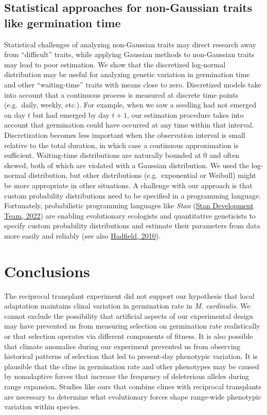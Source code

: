 \documentclass[
  12pt,
]{article}
\begin{document}
\hypertarget{statistical-approaches-for-non-gaussian-traits-like-germination-time}{%
\subsection{Statistical approaches for non-Gaussian traits like germination time}\label{statistical-approaches-for-non-gaussian-traits-like-germination-time}}

Statistical challenges of analyzing non-Gaussian traits may direct research away from ``difficult'' traits, while applying Gaussian methods to non-Gaussian traits may lead to poor estimation. We show that the discretized log-normal distribution may be useful for analyzing genetic variation in germination time and other ``waiting-time'' traits with means close to zero. Discretized models take into account that a continuous process is measured at discrete time points (e.g.~daily, weekly, etc.). For example, when we saw a seedling had not emerged on day \(t\) but had emerged by day \(t+1\), our estimation procedure takes into account that germination could have occurred at any time within that interval. Discretization becomes less important when the observation interval is small relative to the total duration, in which case a continuous approximation is sufficient. Waiting-time distributions are naturally bounded at \(0\) and often skewed, both of which are violated with a Gaussian distribution. We used the log-normal distribution, but other distributions (e.g.~exponential or Weibull) might be more appropriate in other situations. A challenge with our approach is that custom probability distributions need to be specified in a programming language. Fortunately, probabilistic programming languages like \emph{Stan} (\protect\hyperlink{ref-stan_development_team_stan_2022}{Stan Development Team, 2022}) are enabling evolutionary ecologists and quantitative geneticists to specify custom probability distributions and estimate their parameters from data more easily and reliably (see also \protect\hyperlink{ref-hadfield_mcmc_2010}{Hadfield, 2010}).

\hypertarget{conclusions}{%
\section{Conclusions}\label{conclusions}}

The reciprocal transplant experiment did not support our hypothesis that local adaptation maintains clinal variation in germination rate in \emph{M. cardinalis}. We cannot exclude the possibility that artificial aspects of our experimental design may have prevented us from measuring selection on germination rate realistically or that selection operates via different components of fitness. It is also possible that climate anomalies during our experiment prevented us from observing historical patterns of selection that led to present-day phenotypic variation. It is plausible that the cline in germination rate and other phenotypes may be caused by nonadaptive forces that increase the frequency of deleterious alleles during range expansion. Studies like ours that combine clines with reciprocal transplants are necessary to determine what evolutionary forces shape range-wide phenotypic variation within species.
\end{document}
